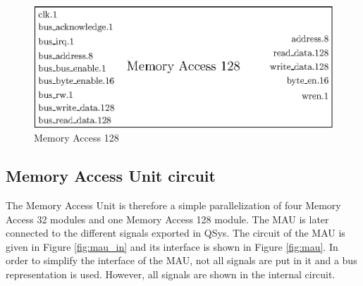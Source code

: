 \begin{figure}[ht!]
    \center
    \includegraphics[scale=0.8]{"Chapter5-MAU_CTRLU/res/memory_access_128"}
    \caption{Memory Access 128}
    \label{fig:ma128}
\end{figure}

\subsection{Memory Access Unit circuit}

The Memory Access Unit is therefore a simple parallelization of four Memory Access 32 modules and 
one Memory Access 128 module. The MAU is later connected to the different signals exported in 
QSys. The circuit of the MAU is given in Figure \ref{fig:mau_in} and its interface is shown in 
Figure \ref{fig:mau}. In order to simplify the interface of the MAU, not all signals are put in it 
and a bus representation is used. However, all signals are shown in the internal circuit.

